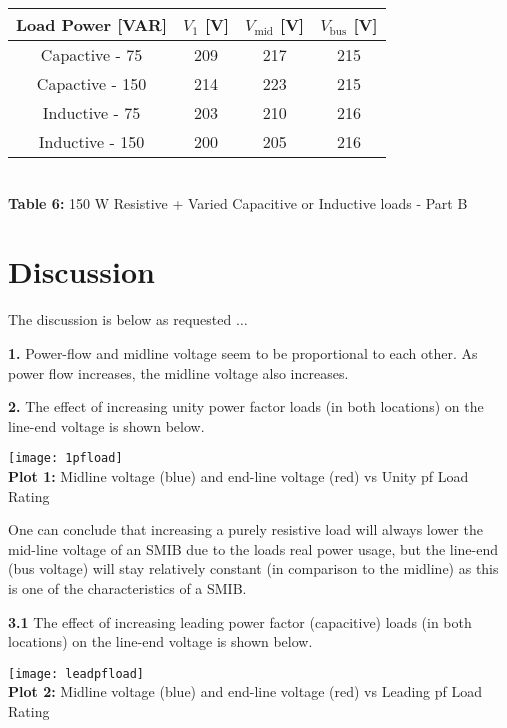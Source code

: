 \documentclass[]{report}
\begin{document}
\begin{table}[h] \centering
	\begin{tabular}{@{}cccc@{}}
		\toprule
		Load Power [VAR] 	& $V_1$ [V] & $V_\text{mid}$  [V]& $V_\text{bus}$ [V] \\ \midrule
		Capactive - 75   	&   209 	&  217    		&  215    		\\
		Capactive - 150  	&  214  	&      223		&      215		\\
		Inductive - 75  	&  203  	&      210		&      216		\\
		Inductive - 150 	&   200 	&  	205    		& 216     		\\ \bottomrule
	\end{tabular} \\ \vspace{1em}
	\textbf{Table 6:} 150 W Resistive + Varied Capacitive or Inductive loads - Part B
\end{table}

\newpage 
 
\section*{Discussion}

The discussion is below as requested $\ldots$

\textbf{1.} Power-flow and midline voltage seem to be proportional to each other. As power flow increases, the midline voltage also increases.


\textbf{2.} The effect of increasing unity power factor loads (in both locations) on the line-end voltage is shown below.

\begin{center}
	\texttt{[image: 1pfload]} \\ 
	\textbf{Plot 1:} Midline voltage (blue) and end-line voltage (red) vs Unity pf Load Rating
\end{center}

One can conclude that increasing a purely resistive load will always lower the mid-line voltage of an SMIB due to the loads real power usage, but the line-end (bus voltage) will stay relatively constant (in comparison to the midline) as this is one of the characteristics of a SMIB.

\textbf{3.1}  The effect of increasing leading power factor (capacitive) loads (in both locations) on the line-end voltage is shown below.

\begin{center}
	\texttt{[image: leadpfload]} \\ 
	\textbf{Plot 2:} Midline voltage (blue) and end-line voltage (red) vs Leading pf Load Rating
\end{center}
\end{document}
